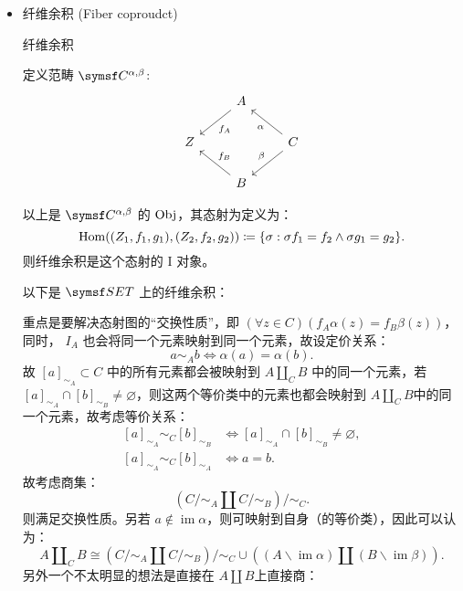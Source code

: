 \begin{itemize}
    \item 纤维余积 (Fiber coproudct)

          \begin{defi}{纤维余积}

              定义范畴 \(\symsf C ^{\alpha,\beta }\):
              \[
                  \begin{tikzcd}
                      {} & A\arrow[ld, "f_A"]   & {}                                          \\
                      Z  & {}                   & C\arrow[lu, "\alpha "]\arrow[ld, "\beta "'] \\
                      {} & B\arrow[lu, "f_B" '] & {}
                  \end{tikzcd}
              \]

              以上是 \(\symsf C^{\alpha ,\beta }\) 的 \(\operatorname{Obj}\)，其态射为定义为：
              \[
                  \Hom((Z_1,f_1,g_1),(Z_2,f_2,g_2)) \coloneqq \left\{ \sigma : \sigma f_1=f_2 \land  \sigma g_1=g_2\right\}
                  .\]
              则纤维余积是这个态射的 I 对象。
          \end{defi}

          以下是 \(\SET\) 上的纤维余积：


          重点是要解决态射图的“交换性质”，即 \((\forall z\in C )(f_A \alpha (z) = f_B \beta (z))\)，同时， \(I_A\) 也会将同一个元素映射到同一个元素，故设定价关系：
          \[
              a\sim_A b \iff \alpha (a) = \alpha (b)
              .\]
          故 \([a]_{\sim_A}\subset C\) 中的所有元素都会被映射到 \(A\amalg _C B\) 中的同一个元素，若 \([a]_{\sim_A}\cap[b]_{\sim_B}\neq \varnothing\)，则这两个等价类中的元素也都会映射到 \(A\amalg _CB\)中的同一个元素，故考虑等价关系：
          \[
              \begin{aligned}
                  [a]_{\sim_A}\sim_C[b]_{\sim_B} & \iff [a]_{\sim_A}\cap[b]_{\sim_B}\neq \varnothing, \\
                  [a]_{\sim_A}\sim_C[b]_{\sim_A} & \iff a=b.
              \end{aligned}
          \]
          故考虑商集：
          \[
              (C/\mathord\sim_A \amalg C/\mathord\sim_B) / \mathord \sim_C
              .\]
          则满足交换性质。另若 \(a\notin \operatorname{im}\alpha\)，则可映射到自身（的等价类），因此可以认为：
          \[
              A\amalg _CB\cong (C/\mathord\sim_A \amalg C/\mathord\sim_B) / \mathord \sim_C \cup((A\backslash\! \operatorname{im}\alpha )\amalg (B\backslash\! \operatorname{im}\beta  ))
              .\]
          另外一个不太明显的想法是直接在 \(A\amalg B\)上直接商：


\end{itemize}
